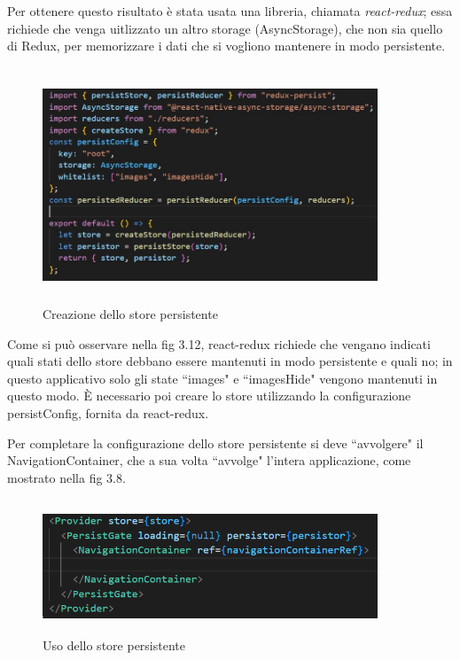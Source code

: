 Per ottenere questo risultato \`e stata usata una libreria, chiamata \textit{react-redux}; essa richiede che venga uitlizzato un altro storage {}(AsyncStorage), che non sia quello di Redux, per memorizzare i dati che si vogliono mantenere in modo persistente.
\begin{figure}[h]
    \centering
    \includegraphics[width=10cm, height=7cm]{images/persistStore.jpg}
    \caption[differenzeiteot]{Creazione dello store persistente}
    \label{fig:persistStore}
\end{figure}

Come si pu\`o osservare nella fig 3.12, react-redux richiede che vengano indicati quali stati dello store debbano essere mantenuti in modo persistente e quali no; in questo applicativo solo gli state ``images" e ``imagesHide" vengono mantenuti in questo modo.
\`E necessario poi creare lo store utilizzando la configurazione persistConfig, fornita da react-redux.

Per completare la configurazione dello store persistente si deve ``avvolgere" il NavigationContainer, che a sua volta ``avvolge" l'intera applicazione, come mostrato nella fig 3.8.
\begin{figure}[h]
    \centering
    \includegraphics[width=10cm, height=4cm]{images/WrapNavigationConteiner.png}
    \caption[differenzeiteot]{Uso dello store persistente}
    \label{fig:usoStorePersistente}
\end{figure}

